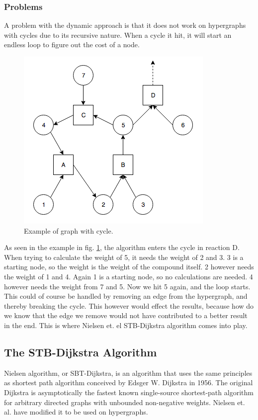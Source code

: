 \documentclass[a4paper,10pt,titlepage]{paper}
\begin{document}
\subsubsection{Problems}
A problem with the dynamic approach is that it does not work on hypergraphs with cycles due to its recursive nature. When a cycle it hit, it will start an endless loop to figure out the cost of a node. 
\begin{figure}[H]
\centering
\includegraphics[scale=0.5]{Billeder/CycleGraph.png}
\caption{Example of graph with cycle.}
\label{fig::CycleGraph}
\end{figure}
As seen in the example in fig. \ref{fig::CycleGraph}, the algorithm enters the cycle in reaction D. When trying to calculate the weight of 5, it needs the weight of 2 and 3. 3 is a starting node, so the weight is the weight of the compound itself. 2 however needs the weight of 1 and 4. Again 1 is a starting node, so no calculations are needed. 4 however needs the weight from 7 and 5. Now we hit 5 again, and the loop starts. This could of course be handled by removing an edge from  the hypergraph, and thereby breaking the cycle. This however would effect the results, because how do we know that the edge we remove would not have contributed to a better result in the end. This is where Nielsen et. el STB-Dijkstra algorithm comes into play.
\subsection{The STB-Dijkstra Algorithm} \label{STB-Dijkstra}
Nielsen algorithm, or SBT-Dijkstra, is an algorithm that uses the same principles as shortest path algorithm conceived by Edsger W. Dijkstra in 1956. The original Dijkstra is asymptotically the fastest known single-source shortest-path algorithm for arbitrary directed graphs with unbounded non-negative weights. \cite{Dijkstra} Nielsen et. al. have modified it to be used on hypergraphs.
\end{document}
